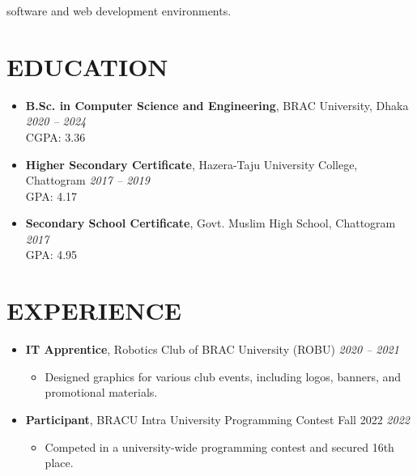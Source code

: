 \documentclass[a4paper,10pt]{article}
\begin{document}
software and web development environments.

\section*{\normalsize EDUCATION}
\begin{itemize}[leftmargin=0.2in, label={}]
    \item \textbf{B.Sc. in Computer Science and Engineering}, BRAC University, Dhaka \hfill \textit{2020 – 2024} \\
    CGPA: 3.36

    \vspace{0.5em}
    
    \item \textbf{Higher Secondary Certificate}, Hazera-Taju University College, Chattogram \hfill \textit{2017 – 2019} \\
    GPA: 4.17

    \vspace{0.5em}
    
    \item \textbf{Secondary School Certificate}, Govt. Muslim High School, Chattogram \hfill \textit{2017} \\
    GPA: 4.95
\end{itemize}

\section*{\normalsize EXPERIENCE}
\begin{itemize}[leftmargin=0.2in, label={}]
    \item \textbf{IT Apprentice}, Robotics Club of BRAC University (ROBU) \hfill \textit{2020 – 2021} \\
    \vspace{-0.8em}    
    \begin{itemize}[leftmargin=0.2in, label={--}, itemsep=0pt, topsep=0pt]
        \item Designed graphics for various club events, including logos, banners, and promotional materials.
    \end{itemize}

    \vspace{1em} %

    \item \textbf{Participant}, BRACU Intra University Programming Contest Fall 2022 \hfill \textit{2022} \\
    \vspace{-0.8em}
    
    \begin{itemize}[leftmargin=0.2in, label={--}, itemsep=0pt, topsep=0pt]
        \item Competed in a university-wide programming contest and secured 16th place.
    \end{itemize}
\end{itemize}
\end{document}
